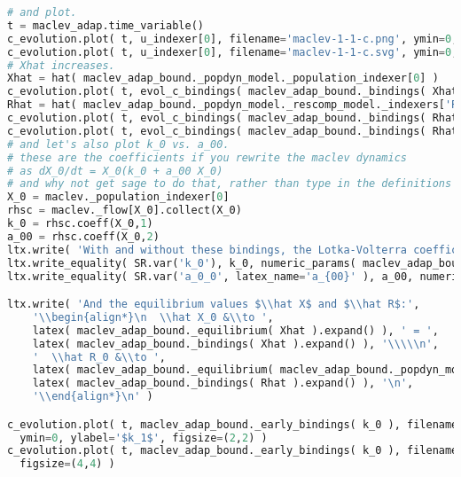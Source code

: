 \begin{lstlisting}[language=Python]
# and plot. 
t = maclev_adap.time_variable()
c_evolution.plot( t, u_indexer[0], filename='maclev-1-1-c.png', ymin=0, ylabel='$c_{00}$', figsize=(4,4) )
c_evolution.plot( t, u_indexer[0], filename='maclev-1-1-c.svg', ymin=0, ylabel='$c_{11}$', figsize=(2,2) )
# Xhat increases.
Xhat = hat( maclev_adap_bound._popdyn_model._population_indexer[0] )
c_evolution.plot( t, evol_c_bindings( maclev_adap_bound._bindings( Xhat ) ), filename="maclev-1-1-X.png", ylabel=Xhat, figsize=(4,4) )
Rhat = hat( maclev_adap_bound._popdyn_model._rescomp_model._indexers['R'][0] )
c_evolution.plot( t, evol_c_bindings( maclev_adap_bound._bindings( Rhat ) ), filename="maclev-1-1-R.svg", figsize=(2,2), ymin=0, ylabel='$\hat{R}_1$' )
c_evolution.plot( t, evol_c_bindings( maclev_adap_bound._bindings( Rhat ) ), filename="maclev-1-1-R.png", figsize=(4,4), ymin=0, ylabel=Rhat )
# and let's also plot k_0 vs. a_00.
# these are the coefficients if you rewrite the maclev dynamics
# as dX_0/dt = X_0(k_0 + a_00 X_0)
# and why not get sage to do that, rather than type in the definitions
X_0 = maclev._population_indexer[0]
rhsc = maclev._flow[X_0].collect(X_0)
k_0 = rhsc.coeff(X_0,1)
a_00 = rhsc.coeff(X_0,2)
ltx.write( 'With and without these bindings, the Lotka-Volterra coefficients $k_0$ and $a_{00}$ are:' )
ltx.write_equality( SR.var('k_0'), k_0, numeric_params( maclev_adap_bound._early_bindings(k_0)) )
ltx.write_equality( SR.var('a_0_0', latex_name='a_{00}' ), a_00, numeric_params( maclev_adap_bound._early_bindings(a_00) ) )

ltx.write( 'And the equilibrium values $\\hat X$ and $\\hat R$:',
    '\\begin{align*}\n  \\hat X_0 &\\to ',
    latex( maclev_adap_bound._equilibrium( Xhat ).expand() ), ' = ',
    latex( maclev_adap_bound._bindings( Xhat ).expand() ), '\\\\\n',
    '  \\hat R_0 &\\to ',
    latex( maclev_adap_bound._equilibrium( maclev_adap_bound._popdyn_model._bindings( Rhat ) ).expand() ), ' = ',
    latex( maclev_adap_bound._bindings( Rhat ).expand() ), '\n',
    '\\end{align*}\n' )

c_evolution.plot( t, maclev_adap_bound._early_bindings( k_0 ), filename="maclev-1-1-k.svg",
  ymin=0, ylabel='$k_1$', figsize=(2,2) )
c_evolution.plot( t, maclev_adap_bound._early_bindings( k_0 ), filename="maclev-1-1-k.png",
  figsize=(4,4) )


\end{lstlisting}
